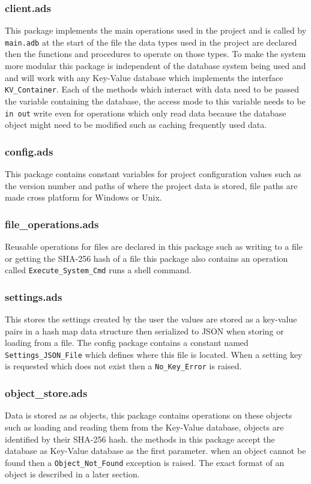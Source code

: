 \documentclass[12pt,a4paper]{article}
\newcommand{\codetext}[1]{\colorbox{light-gray}{\texttt{#1}}}
\begin{document}
\subsubsection{client.ads}
This package implements the main operations used in the project and is called by \codetext{main.adb} at the start of the file the data types used in the project are declared then the functions and procedures to operate on those types. To make the system more modular this package is independent of the database system being used and and will work with any Key-Value database which implements the interface \codetext{KV\_Container}. Each of the methods which interact with data need to be passed the variable containing the database, the access mode to this variable needs to be \codetext{in out} write even for operations which only read data because the database object might need to be modified such as caching frequently used data.

\subsubsection{config.ads}
This package contains constant variables for project configuration values such as the version number and paths of where the project data is stored, file paths are made cross platform for Windows or Unix.

\subsubsection{file\_operations.ads}
Reusable operations for files are declared in this package such as writing to a file or getting the SHA-256 hash of a file this package also contains an operation called \codetext{Execute\_System\_Cmd} runs a shell command.

\subsubsection{settings.ads}
This stores the settings created by the user the values are stored as a key-value pairs in a hash map data structure then serialized to JSON when storing or loading from a file. The config package contains a constant named \codetext{Settings\_JSON\_File} which defines where this file is located. When a setting key is requested which does not exist then a 
\codetext{No\_Key\_Error} is raised.

\subsubsection{object\_store.ads}
Data is stored as as objects, this package contains operations on these objects such as loading and reading them from the Key-Value database, objects are identified by their SHA-256 hash. the methods in this package accept the database as Key-Value database as the first parameter. when an object cannot be found then a \codetext{Object\_Not\_Found} exception is raised. The exact format of an object is described in a later section.
\end{document}
